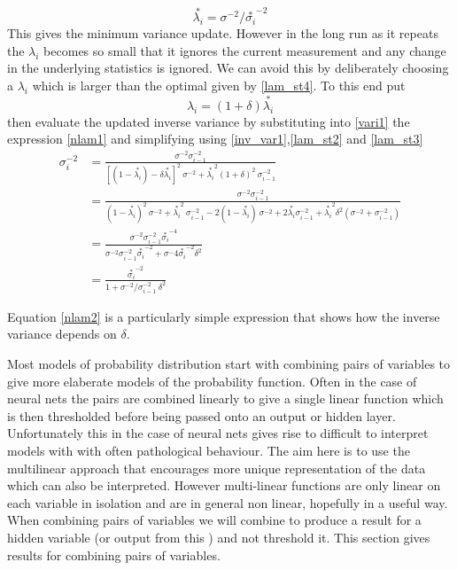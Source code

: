 \documentclass[a4paper,oneside,english]{article}
\numberwithin{equation}{section}
\numberwithin{figure}{section}
\begin{document}
\begin{equation}\label{lam_st4}
\stackrel{*}{\lambda_i}=\sigma^{-2}/\stackrel{*}{\sigma_{i}}^{-2}
\end{equation} 
This gives the minimum variance update. However in the long run as it repeats the $\lambda_i$ becomes so small that it ignores the current measurement and any change in the underlying statistics is ignored. We can avoid this by deliberately choosing a $\lambda_i$ which is larger than the optimal given by \eqref{lam_st4}. To this end put 
\begin{equation}\label{nlam1}
\lambda_i = (1+\delta)\stackrel{*}{\lambda_i}
\end{equation} 
then evaluate the updated inverse variance by substituting into
\eqref{vari1} the expression \eqref{nlam1} and simplifying using \eqref{inv_var1},\eqref{lam_st2} and \eqref{lam_st3}
\begin{align}
\sigma_i^{-2}&= \frac{\sigma^{-2} \sigma_{i-1}^{-2}}
{[(1-\stackrel{*}{\lambda_i})-\delta \stackrel{*}{\lambda_i}]^2\: \sigma^{-2}+\stackrel{*}{\lambda_i}^2 (1+\delta)^2\: \sigma_{i-1}^{-2}}\\
&= \frac{\sigma^{-2} \sigma_{i-1}^{-2}}{(1-\stackrel{*}{\lambda_i})^2\:\sigma^{-2}+ \stackrel{*}{\lambda_i}^2\:\sigma_{i-1}^{-2} 
	-2(1-\stackrel{*}{\lambda_i})\:\sigma^{-2}
	+2\stackrel{*}{\lambda_i}\sigma_{i-1}^{-2}
	+\stackrel{*}{\lambda_i}^2\delta^2(\sigma^{-2}+\sigma_{i-1}^{-2}) }	\\
&=\frac{\sigma^{-2}\sigma_{i-1}^{-2}\stackrel{*}{\sigma_i}^{-4} } 
{\sigma^{-2}\sigma_{i-1}^{-2}\stackrel{*}{\sigma_i}^{-2}+\sigma^-4 \stackrel{*}{\sigma_i}^{-2}\delta^2 }\\
&=\frac{\stackrel{*}{\sigma_i}^{-2}}
{1+\sigma^{-2}/\sigma_{i-1}^{-2}\:\delta^2 }\label{nlam2}
\end{align}

Equation \eqref{nlam2} is a particularly simple expression that shows how the inverse variance depends on $\delta$.


Most models of probability distribution start with combining pairs
of variables to give more elaberate models of the probability function.
Often in the case of neural nets the pairs are combined linearly
to give a single linear function which is then thresholded before
being passed onto an output or hidden layer. Unfortunately this in
the case of neural nets gives rise to difficult to interpret models
with with often pathological behaviour. The aim here is to use the
multilinear approach that encourages more unique representation of
the data which can also be interpreted. However multi-linear functions
are only linear on each variable in isolation and are in general non
linear, hopefully in a useful way. When combining pairs of variables
we will combine to produce a result for a hidden variable (or output
from this ) and not threshold it. This section gives
results for combining pairs of variables. 
\end{document}
